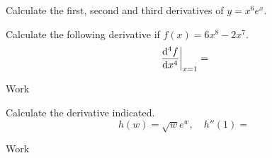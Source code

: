 \documentclass[12pt,addpoints, answers, fleqn]{exam}
\begin{document}
\begin{teacher}
\begin{questions}

\question 	%

Calculate the first, second and third derivatives of $y = x^6e^x$.

\question 	%

Calculate the following derivative if $f\left(x\right) = 6x^8  - 2x^7$.
\[
\left. \frac{{\rm{d}}^4f}{{\rm{d}}x^4} \right|_{x=1} =
\]
\begin{solution}
Work
\end{solution}

\question 	%

Calculate the derivative indicated.
\[
h\left(w\right) = \sqrt{w} e^w, \quad h''\left( 1 \right) =
\]
\begin{solution}
Work
\end{solution}

\question 	%


\end{questions}
\end{teacher}
\end{document}
